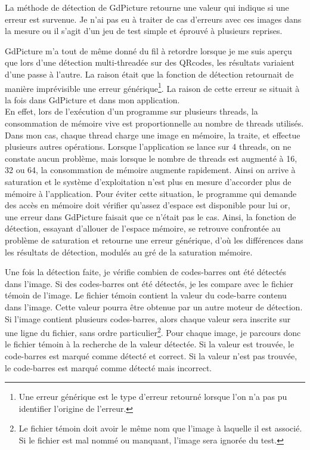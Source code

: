 La méthode de détection de GdPicture retourne une valeur qui indique si une erreur est survenue. Je n'ai pas eu à traiter de cas d'erreurs avec ces images dans la mesure ou il s'agit d'un jeu de test simple et éprouvé à plusieurs reprises.

GdPicture m'a tout de même donné du fil à retordre lorsque je me suis aperçu que lors d'une détection multi-threadée sur des QRcodes, les résultats variaient d'une passe à l'autre. La raison était que la fonction de détection retournait de manière imprévisible une erreur générique\footnote{Une erreur générique est le type d'erreur retourné lorsque l'on n'a pas pu identifier l'origine de l'erreur.}. La raison de cette erreur se situait à la fois dans GdPicture et dans mon application.\\
En effet, lors de l'exécution d'un programme sur plusieurs threads, la consommation de mémoire vive est proportionnelle au nombre de threads utilisés. Dans mon cas, chaque thread charge une image en mémoire, la traite, et effectue plusieurs autres opérations. Lorsque l'application se lance sur 4 threads, on ne constate aucun problème, mais lorsque le nombre de threads est augmenté à 16, 32 ou 64, la consommation de mémoire augmente rapidement. Ainsi on arrive à saturation et le système d'exploitation n'est plus en mesure d'accorder plus de mémoire à l'application. Pour éviter cette situation, le programme qui demande des accès en mémoire doit vérifier qu'assez d'espace est disponible pour lui or, une erreur dans GdPicture faisait que ce n'était pas le cas. Ainsi, la fonction de détection, essayant d'allouer de l'espace mémoire, se retrouve confrontée au problème de saturation et retourne une erreur générique, d'où les différences dans les résultats de détection, modulés au gré de la saturation mémoire.

Une fois la détection faite, je vérifie combien de codes-barres ont été détectés dans l'image. Si des codes-barres ont été détectés, je les compare avec le fichier témoin de l'image. Le fichier témoin contient la valeur du code-barre contenu dans l'image. Cette valeur pourra être obtenue par un autre moteur de détection. Si l'image contient plusieurs codes-barres, alors chaque valeur sera inscrite sur une ligne du fichier, sans ordre particulier\footnote{Le fichier témoin doit avoir le même nom que l'image à laquelle il est associé. Si le fichier est mal nommé ou manquant, l'image sera ignorée du test.}. Pour chaque image, je parcours donc le fichier témoin à la recherche de la valeur détectée. Si la valeur est trouvée, le code-barres est marqué comme détecté et correct. Si la valeur n'est pas trouvée, le code-barres est marqué comme détecté mais incorrect.

